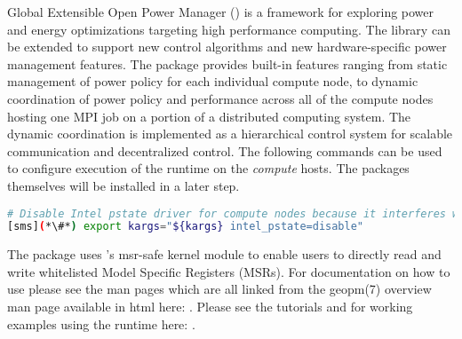Global Extensible Open Power Manager (\GEOPM{}) is a framework for exploring
power and energy optimizations targeting high performance computing.  The
library can be extended to support new control algorithms and new
hardware-specific power management features.  The \GEOPM{} package provides
built-in features ranging from static management of power policy for each
individual compute node, to dynamic coordination of power policy and
performance across all of the compute nodes hosting one MPI job on a portion of
a distributed computing system.  The dynamic coordination is implemented as a
hierarchical control system for scalable communication and decentralized
control. The following commands can be used to configure execution of the
\GEOPM{} runtime on the {\em compute} hosts. The packages themselves will be
installed in a later step.

\begin{lstlisting}[language=bash,keywords={},upquote=true]
# Disable Intel pstate driver for compute nodes because it interferes with GEOPM's operation.
[sms](*\#*) export kargs="${kargs} intel_pstate=disable"
\end{lstlisting}

\noindent The \GEOPM{} package uses \OHPC{}'s msr-safe kernel module
to enable users to directly read and write whitelisted Model Specific
Registers (MSRs).  For documentation on how to use \GEOPM{} please see
the \GEOPM{} man pages which are all linked from the geopm(7) overview
man page available in html here:
\href{http://geopm.github.io/man/geopm.7.html}
{\color{blue}{http://geopm.github.io/man/geopm.7.html}}.
Please see the \GEOPM{} tutorials and for working examples using the
\GEOPM{} runtime here: \href{https://github.com/geopm/geopm/tree/dev/tutorial}
{\color{blue}{https://github.com/geopm/geopm/tree/dev/tutorial}}.
